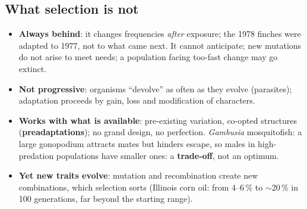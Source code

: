 \subsection{What selection is not}
\begin{itemize}
\item \textbf{Always behind}: it changes frequencies \emph{after} exposure; the 1978 finches were adapted to 1977, not to
what came next. It cannot anticipate; new mutations do not arise to meet needs; a population facing too-fast change may go
extinct.
\item \textbf{Not progressive}: organisms ``devolve'' as often as they evolve (parasites); adaptation proceeds by gain,
loss and modification of characters.
\item \textbf{Works with what is available}: pre-existing variation, co-opted structures (\textbf{preadaptations}); no grand
design, no perfection. \emph{Gambusia} mosquitofish: a large gonopodium attracts mates but hinders escape, so males in
high-predation populations have smaller ones: a \textbf{trade-off}, not an optimum.
\item \textbf{Yet new traits evolve}: mutation and recombination create new combinations, which selection sorts (Illinois
corn oil: from 4--6\,\% to $\sim$20\,\% in 100 generations, far beyond the starting range).
\end{itemize}

